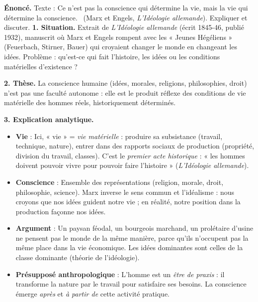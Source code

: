\documentclass[11pt]{article}
\newcommand{\cle}[1]{{\popxbold\color{popdark}#1}}
\begin{document}
\begin{exoresolu}
\textbf{Énoncé.} Texte : \guillemotleft Ce n'est pas la conscience qui détermine la vie, mais la vie qui détermine la conscience. \guillemotright\ (Marx et Engels, \emph{L'Idéologie allemande}). Expliquer et discuter.
\tcblower
\textbf{1. Situation.} Extrait de \emph{L'Idéologie allemande} (écrit 1845-46, publié 1932), manuscrit où Marx et Engels rompent avec les « Jeunes Hégéliens » (Feuerbach, Stirner, Bauer) qui croyaient changer le monde en changeant les idées. Problème : qu'est-ce qui fait l'histoire, les idées ou les conditions matérielles d'existence ?

\textbf{2. Thèse.} La conscience humaine (idées, morales, religions, philosophies, droit) n'est pas une faculté autonome : elle est le produit réflexe des conditions de vie matérielle des hommes réels, historiquement déterminés.

\textbf{3. Explication analytique.}
\begin{itemize}
\item \textbf{\cle{Vie}} : Ici, « vie » = \emph{vie matérielle} : produire sa subsistance (travail, technique, nature), entrer dans des rapports sociaux de production (propriété, division du travail, classes). C'est le \emph{premier acte historique} : « les hommes doivent pouvoir vivre pour pouvoir faire l'histoire » (\emph{L'Idéologie allemande}).
\item \textbf{\cle{Conscience}} : Ensemble des représentations (religion, morale, droit, philosophie, science). Marx inverse le sens commun et l'idéalisme : nous croyons que nos idées guident notre vie ; en réalité, notre position dans la production façonne nos idées.
\item \textbf{Argument} : Un paysan féodal, un bourgeois marchand, un prolétaire d'usine ne pensent pas le monde de la même manière, parce qu'ils n'occupent pas la même place dans la vie économique. Les idées dominantes sont celles de la classe dominante (théorie de l'idéologie).
\item \textbf{Présupposé anthropologique} : L'homme est un \emph{être de praxis} : il transforme la nature par le travail pour satisfaire ses besoins. La conscience émerge \emph{après} et \emph{à partir de} cette activité pratique.
\end{itemize}


\end{exoresolu}
\end{document}
